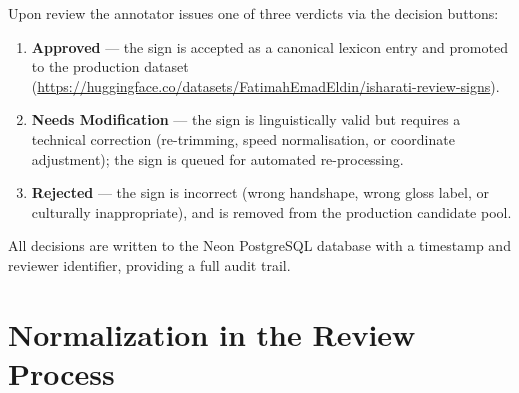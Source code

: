 Upon review the annotator issues one of three verdicts via the decision buttons:
\begin{enumerate}[leftmargin=*,itemsep=2pt]
  \item \textbf{Approved} --- the sign is accepted as a canonical lexicon entry and promoted to the
    production dataset (\url{https://huggingface.co/datasets/FatimahEmadEldin/isharati-review-signs}).
  \item \textbf{Needs Modification} --- the sign is linguistically valid but requires a technical
    correction (re-trimming, speed normalisation, or coordinate adjustment); the sign is queued
    for automated re-processing.
  \item \textbf{Rejected} --- the sign is incorrect (wrong handshape, wrong gloss label, or
    culturally inappropriate), and is removed from the production candidate pool.
\end{enumerate}
All decisions are written to the Neon PostgreSQL database with a timestamp and reviewer identifier,
providing a full audit trail.

\section{Normalization in the Review Process}
\label{sec:verification_normalization}

